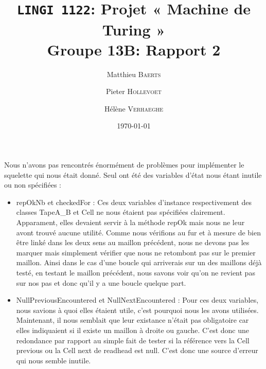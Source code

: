 \documentclass[a4paper,11pt]{article}
\title{\texttt{LINGI 1122}: Projet « Machine de Turing » \\ {\large Groupe 13B: Rapport 2}}
\author{Matthieu \textsc{Baerts} \and Pieter \textsc{Hollevoet} \and Hélène \textsc{Verhaeghe}}
\date{\today}
\begin{document}
\maketitle


Nous n'avons pas rencontrés énormément de problèmes pour implémenter le squelette qui nous était donné. Seul ont été des variables d'état nous étant inutile ou non spécifiées :
\begin{itemize}
\item repOkNb et checkedFor : Ces deux variables d'instance respectivement des classes TapeA\_B et Cell ne nous étaient pas spécifiées clairement. Apparament, elles devaient servir à la méthode repOk mais nous ne leur avont trouvé aucune utilité. Comme nous vérifions au fur et à mesure de bien être linké dans les deux sens au maillon précédent, nous ne devons pas les marquer mais simplement vérifier que nous ne retombont pas sur le premier maillon. Ainsi dans le cas d'une boucle qui arriverais sur un des maillons déjà testé, en testant le maillon précédent, nous savons voir qu'on ne revient pas sur nos pas et donc qu'il y a une boucle quelque part.
\item NullPreviousEncountered et NullNextEncountered : Pour ces deux variables, nous savions à quoi elles étaient utile, c'est pourquoi nous les avons utilisées. Maintenant, il nous semblait que leur existance n'était pas obligatoire car elles indiquaient si il existe un maillon à droite ou gauche. C'est donc une redondance par rapport au simple fait de tester si la référence vers la Cell previous ou la Cell next de readhead est null. C'est donc une source d'erreur qui nous semble inutile.
\end{itemize}
\end{document}
